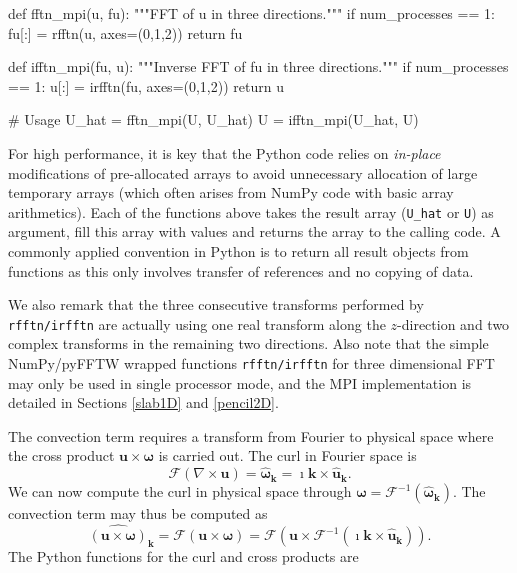 \documentclass[final,3p,times,twocolumn]{elsarticle}
\newcommand{\inpyth}{\lstinline[style=inlinestyle]}
\newcounter{bla}
\begin{document}
\begin{python}
def fftn_mpi(u, fu):
    """FFT of u in three directions."""
    if num_processes == 1:   
        fu[:] = rfftn(u, axes=(0,1,2))
    return fu

def ifftn_mpi(fu, u):
    """Inverse FFT of fu in three directions."""
    if num_processes == 1:
        u[:] = irfftn(fu, axes=(0,1,2))
    return u

# Usage
U_hat = fftn_mpi(U, U_hat)
U = ifftn_mpi(U_hat, U)
\end{python}
For high performance, it is key that the Python code relies on \emph{in-place}
modifications of pre-allocated arrays to avoid unnecessary allocation of
large temporary arrays (which often arises from NumPy code with basic array 
arithmetics). 
Each of the functions above takes the result array (\texttt{U\_hat} or
\texttt{U}) as argument, fill this array with values and returns the
array to the calling code. A commonly applied convention in
Python is to return all result objects from functions as this only involves
transfer of references and no copying of data.

We also remark that the three consecutive transforms performed by 
\inpyth{rfftn/irfftn} are actually using one real transform along the 
$z$-direction and two complex transforms in the remaining two directions. Also 
note that the simple NumPy/pyFFTW wrapped functions \inpyth{rfftn/irfftn} for 
three dimensional FFT may only be used in single processor mode, and the MPI 
implementation is detailed in Sections
\ref{slab1D} and \ref{pencil2D}.

The convection term requires a transform from Fourier to physical space where the cross product $\bm{u} \times \bm{\omega}$ is carried out. The curl in Fourier space is
\begin{equation}
\mathcal{F}(\nabla \times \bm{u}) = \hat{\bm{\omega}}_{\bm{k}} = \imath \bm{k} \times \hat{\bm{u}}_{\bm{k}}.
\end{equation}
We can now compute the curl in physical space through $\bm{\omega} = \mathcal{F}^{-1}(\hat{\bm{\omega}}_{\bm{k}})$. The convection term may thus be computed as
\begin{equation}
\widehat{( \bm{u} \times \bm{\omega})}_{\bm{k}} = \mathcal{F}(\bm{u} \times \bm{\omega}) = \mathcal{F} (\bm{u} \times \mathcal{F}^{-1}(\imath \bm{k} \times \hat{\bm{u}}_{\bm{k}})).
\label{eq:curl_convection}
\end{equation}
The Python functions for the curl and cross products are
\end{document}
